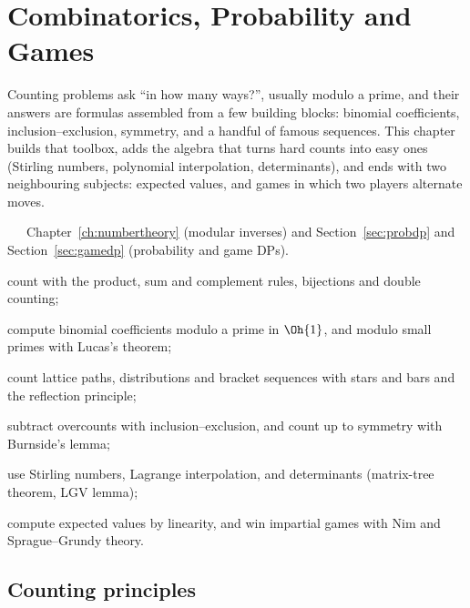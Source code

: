 \chapter{Combinatorics, Probability and Games}\label{ch:combinatorics}

Counting problems ask ``in how many ways?'', usually modulo a prime, and their answers are formulas assembled from a few building
blocks: binomial coefficients, inclusion--exclusion, symmetry, and a handful of famous sequences. This chapter builds that toolbox,
adds the algebra that turns hard counts into easy ones (Stirling numbers, polynomial interpolation, determinants), and ends with two
neighbouring subjects: expected values, and games in which two players alternate moves.

\begin{chapterintro}{\silver\ \gold\ \plat\ \ioi}{Chapter~\ref{ch:numbertheory} (modular inverses) and
Section~\ref{sec:probdp} and Section~\ref{sec:gamedp} (probability and game DPs).}
  \item count with the product, sum and complement rules, bijections and double counting;
  \item compute binomial coefficients modulo a prime in $\Oh{1}$, and modulo small primes with Lucas's theorem;
  \item count lattice paths, distributions and bracket sequences with stars and bars and the reflection principle;
  \item subtract overcounts with inclusion--exclusion, and count up to symmetry with Burnside's lemma;
  \item use Stirling numbers, Lagrange interpolation, and determinants (matrix-tree theorem, LGV lemma);
  \item compute expected values by linearity, and win impartial games with Nim and Sprague--Grundy theory.
\end{chapterintro}

\section[Counting principles]{Counting principles \hfill \silver}\label{sec:counting}

